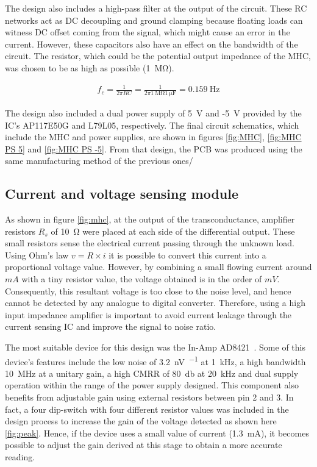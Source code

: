 The design also includes a high-pass filter at the output of the circuit. These RC networks act as DC decoupling and ground clamping because floating loads can witness DC offset coming from the signal, which might cause an error in the current. However, these capacitors also have an effect on the bandwidth of the circuit. The resistor, which could be the potential output impedance of the MHC, was chosen to be as high as possible (\SI{1}{\mega\ohm}).

\begin{align}
	\label{eq:MHC filter}
	f_c = \frac{1}{2 \pi R C} = \frac{1}{2 \pi \SI{1}{\mega\ohm} \SI{1}{\micro\farad}} = \SI{0.159}{\hertz}
\end{align}

The design also included a dual power supply of \SI{5}{\volt} and -\SI{5}{\volt} provided by the IC's AP117E50G and L79L05, respectively. The final circuit schematics, which include the MHC and power supplies, are shown in figures \ref{fig:MHC}, \ref{fig:MHC PS 5} and \ref{fig:MHC PS -5}. From that design, the PCB was produced using the same manufacturing method of the previous ones/

\subsection{Current and voltage sensing module}
\label{section V&I sense}
As shown in figure \ref{fig:mhc}, at the output of the transconductance, amplifier resistors $R_s$ of \SI{10}{\ohm} were placed at each side of the differential output. These small resistors sense the electrical current passing through the unknown load. Using Ohm's law $v=R \times i$ it is possible to convert this current into a proportional voltage value. However, by combining a small flowing current around $mA$ with a tiny resistor value, the voltage obtained is in the order of $mV$. Consequently, this resultant voltage is too close to the noise level, and hence cannot be detected by any analogue to digital converter. Therefore, using a high input impedance amplifier is important to avoid current leakage through the current sensing IC and improve the signal to noise ratio.  

The most suitable device for this design was the In-Amp AD8421~\cite{ad:AD8421}. Some of this device's features include the low noise of \SI{3.2}{\nano\volt\per{}} at \SI{1}{\kHz}, a high bandwidth \SI{10}{\MHz} at a unitary gain, a high CMRR of \SI{80}{\decibel} at \SI{20}{\kHz} and dual supply operation within the range of the power supply designed. This component also benefits from adjustable gain using external resistors between pin 2 and 3. In fact, a four dip-switch with four different resistor values was included in the design process to increase the gain of the voltage detected as shown here \ref{fig:peak}. Hence, if the device uses a small value of current (\SI{1.3}{\mA}), it becomes possible to adjust the gain derived at this stage to obtain a more accurate reading.

